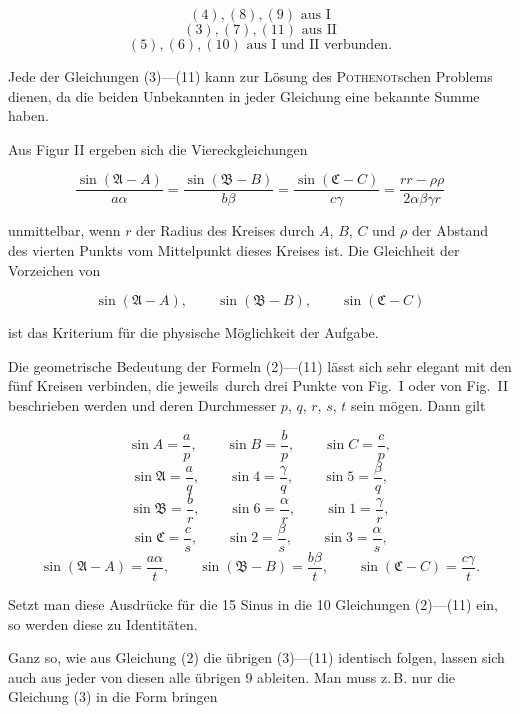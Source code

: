 
\[
(4), (8), (9) \text{ aus I}
\]
\[
(3), (7), (11) \text{ aus II}
\]
\[
(5), (6), (10) \text{ aus I und II verbunden.}
\]

Jede der Gleichungen (3)—(11) kann zur Lösung des \textsc{Pothenot}schen Problems dienen, da die beiden Unbekannten in jeder Gleichung eine bekannte Summe haben.

Aus Figur II ergeben sich die Viereckgleichungen

\[
\frac{\sin(\mathfrak{A}-A)}{a\alpha} = \frac{\sin(\mathfrak{B}-B)}{b\beta} = \frac{\sin(\mathfrak{C}-C)}{c\gamma} = \frac{rr-\rho\rho}{2\alpha\beta\gamma r}
\]

unmittelbar, wenn $r$ der Radius des Kreises durch $A$, $B$, $C$ und $\rho$ der Abstand des vierten Punkts vom Mittelpunkt dieses Kreises ist. Die Gleichheit der Vorzeichen von

\[
\sin(\mathfrak{A}-A), \qquad \sin(\mathfrak{B}-B), \qquad \sin(\mathfrak{C}-C)
\]

ist das Kriterium für die physische Möglichkeit der Aufgabe.

Die geometrische Bedeutung der Formeln (2)—(11) lässt sich sehr elegant mit den fünf Kreisen verbinden, die jeweils\ durch drei Punkte von Fig.\ I oder von Fig.\ II beschrieben werden und deren Durchmesser $p$, $q$, $r$, $s$, $t$ sein mögen. Dann gilt

\[
\sin A = \frac{a}{p}, \qquad \sin B = \frac{b}{p}, \qquad \sin C = \frac{c}{p},
\]
\[
\sin\mathfrak{A} = \frac{a}{q}, \qquad \sin 4 = \frac{\gamma}{q}, \qquad \sin 5 = \frac{\beta}{q},
\]
\[
\sin\mathfrak{B} = \frac{b}{r}, \qquad \sin 6 = \frac{\alpha}{r}, \qquad \sin 1 = \frac{\gamma}{r},
\]
\[
\sin\mathfrak{C} = \frac{c}{s}, \qquad \sin 2 = \frac{\beta}{s}, \qquad \sin 3 = \frac{\alpha}{s},
\]
\[
\sin(\mathfrak{A}-A) = \frac{a\alpha}{t}, \qquad \sin(\mathfrak{B}-B) = \frac{b\beta}{t}, \qquad \sin(\mathfrak{C}-C) = \frac{c\gamma}{t}.
\]

Setzt man diese Ausdrücke für die 15 Sinus in die 10 Gleichungen (2)—(11) ein, so werden diese zu Identitäten.

Ganz so, wie aus Gleichung (2) die übrigen (3)—(11) identisch folgen, lassen sich auch aus jeder von diesen alle übrigen 9 ableiten. Man muss z.\,B. nur die Gleichung (3) in die Form bringen
